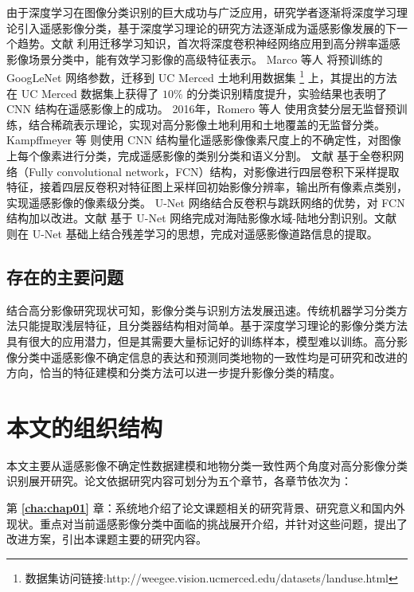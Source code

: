 由于深度学习在图像分类识别的巨大成功与广泛应用，研究学者逐渐将深度学习理论引入遥感影像分类，基于深度学习理论的研究方法逐渐成为遥感影像发展的下一个趋势。文献 \cite{hu2015transferring} 利用迁移学习知识，首次将深度卷积神经网络应用到高分辨率遥感影像场景分类中，能有效学习影像的高级特征表示。 Marco 等人 \cite{castelluccio2015land} 将预训练的 GoogLeNet 网络参数，迁移到 UC Merced 土地利用数据集 \footnote{数据集访问链接:http://weegee.vision.ucmerced.edu/datasets/landuse.html} 上，其提出的方法在 UC Merced 数据集上获得了 $10\%$ 的分类识别精度提升，实验结果也表明了 CNN 结构在遥感影像上的成功。 2016年，Romero 等人 \cite{romero2016unsupervised} 使用贪婪分层无监督预训练，结合稀疏表示理论，实现对高分影像土地利用和土地覆盖的无监督分类。 Kampffmeyer 等 \cite{kampffmeyer2016semantic} 则使用 CNN 结构量化遥感影像像素尺度上的不确定性，对图像上每个像素进行分类，完成遥感影像的类别分类和语义分割。 文献 \cite{maggiori2016fully} 基于全卷积网络（Fully convolutional network，FCN）结构，对影像进行四层卷积下采样提取特征，接着四层反卷积对特征图上采样回初始影像分辨率，输出所有像素点类别，实现遥感影像的像素级分类。 U-Net \cite{ronneberger2015u} 网络结合反卷积与跳跃网络的优势，对 FCN 结构加以改进。文献 \cite{li2018deepunet} 基于 U-Net 网络完成对海陆影像水域-陆地分割识别。文献 \cite{zhang2018road} 则在 U-Net 基础上结合残差学习的思想，完成对遥感影像道路信息的提取。


\subsection{存在的主要问题}
\label{subsec:1-2-3}
结合高分影像研究现状可知，影像分类与识别方法发展迅速。传统机器学习分类方法只能提取浅层特征，且分类器结构相对简单。基于深度学习理论的影像分类方法具有很大的应用潜力，但是其需要大量标记好的训练样本，模型难以训练。高分影像分类中遥感影像不确定信息的表达和预测同类地物的一致性均是可研究和改进的方向，恰当的特征建模和分类方法可以进一步提升影像分类的精度。

\section{本文的组织结构}
\label{sec:third}
本文主要从遥感影像不确定性数据建模和地物分类一致性两个角度对高分影像分类识别展开研究。论文依据研究内容可划分为五个章节，各章节依次为：

第 \textbf{\ref{cha:chap01}} 章：系统地介绍了论文课题相关的研究背景、研究意义和国内外现状。重点对当前遥感影像分类中面临的挑战展开介绍，并针对这些问题，提出了改进方案，引出本课题主要的研究内容。

